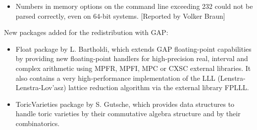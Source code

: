 \documentclass[a4paper,11pt]{report}
\begin{document}
{{\begin{itemize}
\item  Numbers in memory options on the command line exceeding
2\texttt{}32 could not be parsed correctly, even on 64-bit systems.
[Reported by Volker Braun] 
\end{itemize}
 New packages added for the redistribution with \textsf{GAP}: 
\begin{itemize}
\item  \textsf{Float} package by L. Bartholdi, which extends \textsf{GAP} floating-point capabilities by providing new floating-point handlers for
high-precision real, interval and complex arithmetic using MPFR, MPFI, MPC or
CXSC external libraries. It also contains a very high-performance
implementation of the LLL (Lenstra-Lenstra-Lov{\a'a}sz) lattice reduction
algorithm via the external library FPLLL. 
\item  \textsf{ToricVarieties} package by S. Gutsche, which provides data structures to handle toric
varieties by their commutative algebra structure and by their combinatorics. 
\end{itemize}
 }

 }

    
\end{document}
